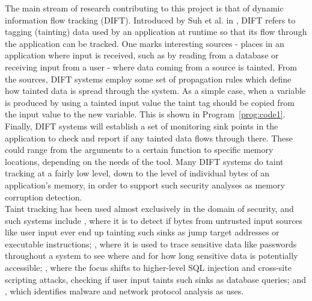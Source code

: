 \documentclass[msc,oneside]{ubcthesis}
\begin{document}
	The main stream of research contributing to this project is that of dynamic information flow tracking (DIFT). Introduced by Suh et al. in \cite{Suh2004}, DIFT refers to tagging (tainting) data used by an application at runtime so that its flow through the application can be tracked. One marks interesting sources - places in an application where input is received, such as by reading from a database or receiving input from a user - where data coming from a source is tainted. From the sources, DIFT systems employ some set of propagation rules which define how tainted data is spread through the system. As a simple case, when a variable is produced by using a tainted input value the taint tag should be copied from the input value to the new variable. This is shown in Program~\ref{prog:code1}. Finally, DIFT systems will establish a set of monitoring sink points in the application to check and report if any tainted data flows through there. These could range from the arguments to a certain function to specific memory locations, depending on the needs of the tool. Many DIFT systems do taint tracking at a fairly low level, down to the level of individual bytes of an application's memory, in order to support such security analyses as memory corruption detection. \\

	Taint tracking has been used almost exclusively in the domain of security, and such systems include \cite{Suh2004} \cite{Newsome2005}, where it is to detect if bytes from untrusted input sources like user input ever end up tainting such sinks as jump target addresses or executable instructions; \cite{Hudgins2004}, where it is used to trace sensitive data like passwords throughout a system to see where and for how long sensitive data is potentially accessible; \cite{Dalton2007}, where the focus shifts to higher-level SQL injection and cross-site scripting attacks, checking if user input taints such sinks as database queries; and \cite{Al-Saleh2010} \cite{Al-Saleh2010a}, which identifies malware and network protocol analysis as uses. \\
	
\end{document}
